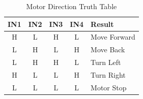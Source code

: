 \begin{table}[H]
\caption{Motor Direction Truth Table}
\centering
\begin{tabular}{ccccl}
\toprule
\textbf{IN1} & \textbf{IN2} & \textbf{IN3} & \textbf{IN4} & \textbf{Result} \\
\midrule
H & L & H & L & Move Forward \\
L & H & L & H & Move Back    \\
L & H & H & L & Turn Left    \\
H & L & L & H & Turn Right   \\
L & L & L & L & Motor Stop   \\
\bottomrule
\end{tabular}
\label{tab:truth}
\end{table}